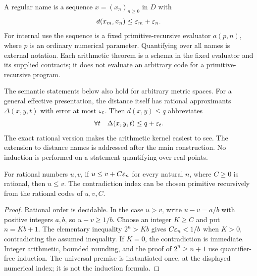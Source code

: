 A regular name is a sequence $x=(x_n)_{n\ge0}$ in $D$ with
\begin{equation}
 d(x_m,x_n)\le\varepsilon_m+\varepsilon_n.
 \label{eq:an-regular}
\end{equation}
For internal use the sequence is a fixed primitive-recursive evaluator
$a(p,n)$, where $p$ is an ordinary numerical parameter.  Quantifying over
all names is external notation.  Each arithmetic theorem is a schema in
the fixed evaluator and its supplied contracts; it does not evaluate an
arbitrary code for a primitive-recursive program.

The semantic statements below also hold for arbitrary metric spaces.
For a general effective presentation, the distance itself has rational
approximants $\Delta(x,y,t)$ with error at most $\varepsilon_t$.  Then
$d(x,y)\le q$ abbreviates
\[
 \forall t\quad \Delta(x,y,t)\le q+\varepsilon_t.
\]
The exact rational version makes the arithmetic kernel easiest to see.
The extension to distance names is addressed after the main construction.
No induction is performed on a statement quantifying over real points.

\begin{lemma}
\label{lem:an-small-error}
For rational numbers $u,v$, if $u\le v+C\varepsilon_n$ for every natural $n$,
where $C\ge0$ is rational, then $u\le v$.  The contradiction index can be
chosen primitive recursively from the rational codes of $u,v,C$.
\end{lemma}

\begin{proof}
Rational order is decidable.  In the case $u>v$, write $u-v=a/b$ with
positive integers $a,b$, so $u-v\ge1/b$.  Choose an integer $K\ge C$ and
put $n=Kb+1$.  The elementary inequality $2^n> Kb$ gives
$C\varepsilon_n<1/b$ when $K>0$, contradicting the assumed inequality.  If
$K=0$, the contradiction is immediate.  Integer arithmetic, bounded
rounding, and the proof of $2^n\ge n+1$ use quantifier-free induction.
The universal premise is instantiated once, at the displayed numerical
index; it is not the induction formula.
\end{proof}

